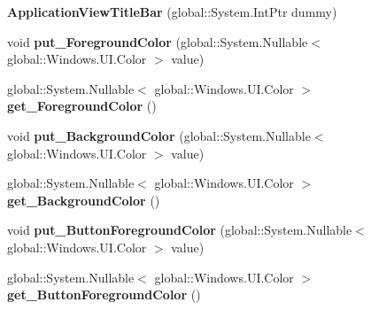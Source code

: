 \begin{DoxyCompactItemize}
{\bfseries Application\+View\+Title\+Bar} (global\+::\+System.\+Int\+Ptr dummy)
\item 
\mbox{\label{class_windows_1_1_u_i_1_1_view_management_1_1_application_view_title_bar_a32a06dddb589fcc84b37bbb52d2fef56}} 
void {\bfseries put\+\_\+\+Foreground\+Color} (global\+::\+System.\+Nullable$<$ global\+::\+Windows.\+U\+I.\+Color $>$ value)
\item 
\mbox{\label{class_windows_1_1_u_i_1_1_view_management_1_1_application_view_title_bar_a0100947ed3af490212e529dba4a068e8}} 
global\+::\+System.\+Nullable$<$ global\+::\+Windows.\+U\+I.\+Color $>$ {\bfseries get\+\_\+\+Foreground\+Color} ()
\item 
\mbox{\label{class_windows_1_1_u_i_1_1_view_management_1_1_application_view_title_bar_a72763c5790a08759eb3aa7f1a034cc1c}} 
void {\bfseries put\+\_\+\+Background\+Color} (global\+::\+System.\+Nullable$<$ global\+::\+Windows.\+U\+I.\+Color $>$ value)
\item 
\mbox{\label{class_windows_1_1_u_i_1_1_view_management_1_1_application_view_title_bar_a10d72a066c2702f38e96eb1f3702b5ab}} 
global\+::\+System.\+Nullable$<$ global\+::\+Windows.\+U\+I.\+Color $>$ {\bfseries get\+\_\+\+Background\+Color} ()
\item 
\mbox{\label{class_windows_1_1_u_i_1_1_view_management_1_1_application_view_title_bar_a607b5d86c746c6283c118cc8e983990a}} 
void {\bfseries put\+\_\+\+Button\+Foreground\+Color} (global\+::\+System.\+Nullable$<$ global\+::\+Windows.\+U\+I.\+Color $>$ value)
\item 
\mbox{\label{class_windows_1_1_u_i_1_1_view_management_1_1_application_view_title_bar_aae493d2a3fa93365f753e29b776af821}} 
global\+::\+System.\+Nullable$<$ global\+::\+Windows.\+U\+I.\+Color $>$ {\bfseries get\+\_\+\+Button\+Foreground\+Color} ()
\item 

\end{DoxyCompactItemize}
